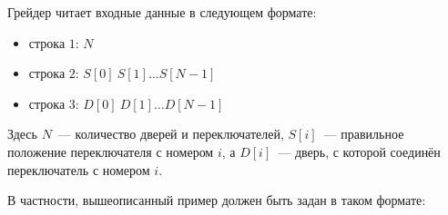 Грейдер читает входные данные в следующем формате:
\begin{itemize}
\item строка $1$: $N$
\item строка $2$: $S[0]\ S[1]\dots S[N­ - 1]$
\item строка $3$: $D[0]\ D[1]\dots D[N­ - 1]$
\end{itemize}

Здесь $N$~--- количество дверей и переключателей, $S[i]$~--- правильное положение переключателя с номером $i$, а $D[i]$~--- дверь, с которой соединён переключатель с номером $i$.

В частности, вышеописанный пример должен быть задан в таком формате:
